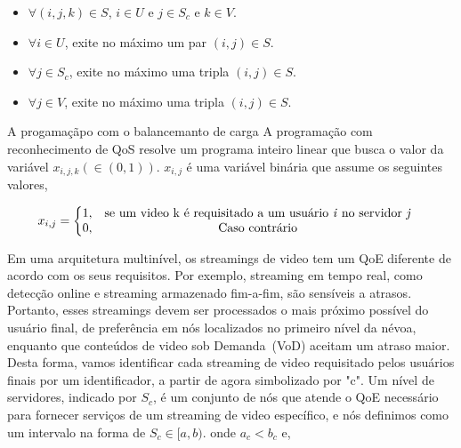 \begin{itemize}
\item $\forall (i,j,k) \in S$, $i \in U$ e $j \in S_{c}$ e $k \in V$.

\item $\forall i \in U$, exite no máximo um par $(i,j) \in S$.

\item $\forall j \in S_{c}$, exite no máximo uma tripla $(i,j) \in S$.

\item $\forall j \in V$, exite no máximo uma tripla $(i,j) \in S$.
\end{itemize}


%
%
%
 
A progamaçãpo com o balancemanto de carga   
A programação com reconhecimento de QoS resolve um programa inteiro linear que busca o valor da variável $x_{i,j,k} (\in (0, 1))$. $x_{i,j}$ é uma variável binária que assume os seguintes valores,

\vspace{0.5cm}
\begin{equation}\label{total_capacity_loss}
x_{i,j} =
\left\{\begin{matrix}
1, & \text{se um video k é requisitado a um usuário \textit{i} no servidor \textit{j}} & \\ 
0, & \text{Caso contrário} & 
\end{matrix}\right.
\end{equation}
\vspace{0.5cm}

Em uma arquitetura multinível, os streamings de video tem um QoE diferente de acordo com os seus requisitos. Por exemplo, streaming em tempo real, como detecção online e streaming armazenado fim-a-fim, são sensíveis a atrasos. Portanto, esses streamings devem ser processados o mais próximo possível do usuário final, de preferência em nós localizados no primeiro nível da névoa, enquanto que conteúdos de video sob Demanda~(VoD) aceitam um atraso maior. Desta forma, vamos identificar cada streaming de video requisitado pelos usuários finais por um identificador, a partir de agora simbolizado por "c".
Um nível de servidores, indicado por $S_{c}$, é um conjunto de nós que atende o QoE necessário para fornecer serviços de um streaming de video específico, e nós definimos como um intervalo na forma de $S_{c} \in [a, b)$. onde $a_{c} < b_{c}$ e,

